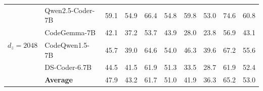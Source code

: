 \documentclass{article}
\theoremstyle{plain}
\theoremstyle{definition}
\theoremstyle{remark}
\begin{document}
\begin{table}[h!]
{{\begin{tabular}{l|l|cc|cc|cc|cc}
\midrule
\multirow{5}{*}{\textbf{$d_z=2048$}}& Qwen2.5-Coder-7B & 59.1& 54.9& 66.4& 54.8& 59.8& 53.0& 74.6& 60.8\\
& CodeGemma-7B & 42.1& 37.2& 53.7& 43.9& 28.0& 23.8& 56.9& 43.1\\
& CodeQwen1.5-7B & 45.7& 39.0& 64.6& 54.0& 46.3& 39.6& 67.2& 55.6\\
& DS-Coder-6.7B & 44.5& 41.5& 61.9& 51.3& 33.5& 28.7& 61.9& 52.4\\
\cline{2-10}
& \cellcolor{gray0}\textbf{Average}
& \cellcolor{gray0}47.9
& \cellcolor{gray0}43.2
& \cellcolor{gray0}61.7
& \cellcolor{gray0}51.0
& \cellcolor{gray0}41.9
& \cellcolor{gray0}36.3
& \cellcolor{gray0}65.2
& \cellcolor{gray0}53.0 \\
\bottomrule
\end{tabular}
}}
\label{tab:hyper_lambda}
\end{table}
\end{document}
